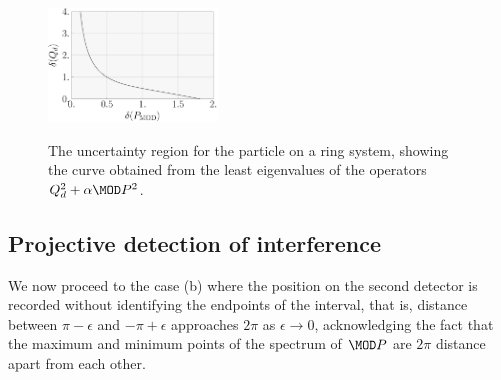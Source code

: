 \begin{figure}
  \includegraphics[width=0.4\textwidth]{ring-ur}
  \label{fig:ring-ur}
  \caption{The uncertainty region for the particle on a ring system, showing the curve obtained from the least eigenvalues of the operators $\Qd^2 + \alpha \MOD P^2$.}
\end{figure}

\subsection{Projective detection of interference}

We now proceed to the case (b) where the position on the second detector is recorded without identifying the endpoints of the interval, that is, distance between $\pi-\epsilon$ and $-\pi+\epsilon$ approaches $2\pi$ as $\epsilon\rightarrow 0$, acknowledging the fact that the maximum and minimum points of the spectrum of $\MOD P$ are $2\pi$ distance apart from each other.

